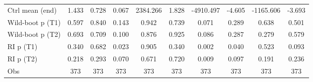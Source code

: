{\begin{tabular}{l*{9}{c}}
Ctrl mean (end)     &       1.433         &       0.728         &       0.067         &    2384.266         &       1.828         &   -4910.497         &      -4.605         &   -1165.606         &      -3.693         \\
Wild-boot p (T1)    &       0.597         &       0.840         &       0.143         &       0.942         &       0.739         &       0.071         &       0.289         &       0.638         &       0.501         \\
Wild-boot p (T2)    &       0.693         &       0.709         &       0.100         &       0.876         &       0.925         &       0.086         &       0.287         &       0.279         &       0.579         \\
RI p (T1)           &       0.340         &       0.682         &       0.023         &       0.905         &       0.340         &       0.002         &       0.040         &       0.523         &       0.093         \\
RI p (T2)           &       0.218         &       0.293         &       0.070         &       0.671         &       0.720         &       0.009         &       0.097         &       0.191         &       0.236         \\
Obs                 &         373         &         373         &         373         &         373         &         373         &         373         &         373         &         373         &         373         \\
\bottomrule
\end{tabular}
}
